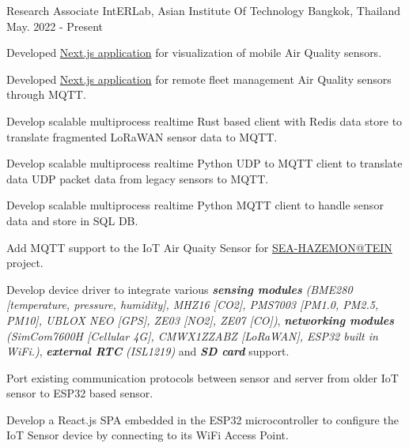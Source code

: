 

\begin{cventries}

  \cventry
  {Research Associate} %
  {IntERLab, Asian Institute Of Technology} %
  {Bangkok, Thailand} %
  {May. 2022 - Present} %
  {\begin{cvitems} %
  		  	\item {Developed \href{https://tracking.hazemon.in.th/}{Next.js application} for visualization of mobile Air Quality sensors. }
  		    \item {Developed \href{https://control.hazemon.in.th/}{Next.js application} for remote fleet management Air Quality sensors through MQTT. }
  			\item {Develop scalable multiprocess realtime Rust based client with Redis data store to translate fragmented LoRaWAN sensor data to MQTT.}
  			\item {Develop scalable multiprocess realtime Python UDP to MQTT client to translate data UDP packet data from legacy sensors to MQTT.}
  		    \item {Develop scalable multiprocess realtime Python MQTT client to handle sensor data and store in SQL DB.}
    		\item {Add MQTT support to the IoT Air Quaity Sensor for \href{https://interlab.ait.ac.th/sea-hazemon-tein-project/}{SEA-HAZEMON@TEIN} project.}
    		\item {Develop device driver to integrate various \emph{\textbf{sensing modules}} \textit{(BME280 [temperature, pressure, humidity], MHZ16 [CO2], PMS7003 [PM1.0, PM2.5, PM10], UBLOX NEO [GPS], ZE03 [NO2], ZE07 [CO])}, \emph{\textbf{networking modules}} \textit{(SimCom7600H [Cellular 4G], CMWX1ZZABZ [LoRaWAN], ESP32 built in WiFi.)}, \emph{\textbf{external RTC}} \textit{(ISL1219)} and \emph{\textbf{SD card}} support.}
    		\item {Port existing communication protocols between sensor and server from older IoT sensor to ESP32 based sensor.}
    		\item {Develop a React.js SPA embedded in the ESP32 microcontroller to configure the IoT Sensor device by connecting to its WiFi Access Point.}

\end{cvitems}}
\end{cventries}
